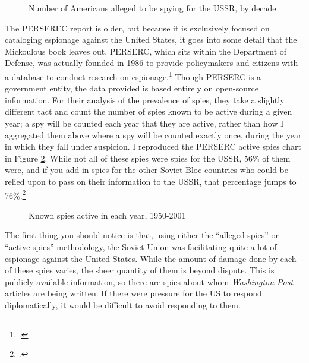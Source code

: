\documentclass{memoir}
\begin{document}
\begin{refsegment}
\begin{figure}[ht]
  \centering
  
  \label{decade_spies}
  \caption{Number of Americans alleged to be spying for the USSR, by decade}
\end{figure}

The PERSEREC report is older, but because it is exclusively focused on cataloging espionage against the United States, it goes into some detail that the Mickoulous book leaves out. PERSERC, which sits within the Department of Defense, was actually founded in 1986 to provide policymakers and citizens with a database to conduct research on espionage.\footcite[p.~v]{herbig_espionage_2002} Though PERSERC is a government entity, the data provided is based entirely on open-source information. For their analysis of the prevalence of spies, they take a slightly different tact and count the number of spies known to be active during a given year; a spy will be counted each year that they are active, rather than how I aggregated them above where a spy will be counted exactly once, during the year in which they fall under suspicion. I reproduced the PERSERC active spies chart in Figure \ref{perserec_spies}. While not all of these spies were spies for the USSR, 56\% of them were, and if you add in spies for the other Soviet Bloc countries who could be relied upon to pass on their information to the USSR, that percentage jumps to 76\%.\footcite[p.~62-63. Herbig and Wiskoff use this method to estimate the amount of espionage undertaken on behalf of the USSR, directly or otherwise.]{herbig_espionage_2002}

\begin{figure}[ht]
  \centering
  
  \label{perserec_spies}
  \caption{Known spies active in each year, 1950-2001}
\end{figure}

The first thing you should notice is that, using either the ``alleged spies'' or ``active spies'' methodology, the Soviet Union was facilitating quite a lot of espionage against the United States. While the amount of damage done by each of these spies varies, the sheer quantity of them is beyond dispute. This is publicly available information, so there are spies about whom \emph{Washington Post} articles are being written. If there were pressure for the US to respond diplomatically, it would be difficult to avoid responding to them.


\end{refsegment}
\end{document}
